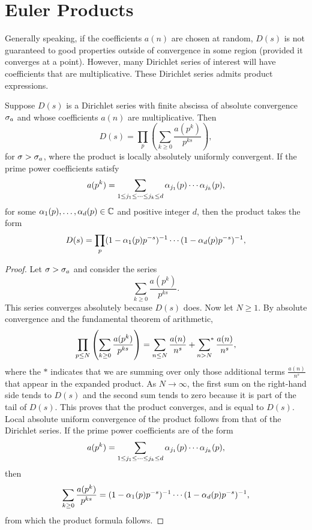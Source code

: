 \documentclass[12pt]{article}
\begin{document}
  \section{Euler Products}
    Generally speaking, if the coefficients \(a(n)\) are chosen at random, \(D(s)\) is not guaranteed to good properties outside of convergence in some region (provided it converges at a point). However, many Dirichlet series of interest will have coefficients that are multiplicative. These Dirichlet series admits product expressions.

    \begin{proposition}\label{prop:Dirichlet_series_Euler_product}
        Suppose \(D(s)\) is a Dirichlet series with finite abscissa of absolute convergence \(\sigma_{a}\) and whose coefficients \(a(n)\) are multiplicative. Then
        \[
          D(s) = \prod_{p}\left(\sum_{k \ge 0}\frac{a(p^{k})}{p^{ks}}\right),
        \]
        for \(\sigma > \sigma_{a}\), where the product is locally absolutely uniformly convergent. If the prime power coefficients satisfy
        \[
          a(p^{k}) = \sum_{1 \le j_{1} \le \cdots \le j_{k} \le d}\alpha_{j_{1}}(p) \cdots \alpha_{j_{k}}(p),
        \]
        for some \(\alpha_{1}(p),\ldots,\alpha_{d}(p) \in \mathbb{C}\) and positive integer \(d\), then the product takes the form
        \[
          D(s) = \prod_{p}(1-\alpha_{1}(p)p^{-s})^{-1} \cdots (1-\alpha_{d}(p)p^{-s})^{-1},
        \]
    \end{proposition}
    \begin{proof}
        Let \(\sigma > \sigma_{a}\) and consider the series
        \[
          \sum_{k \ge 0}\frac{a(p^{k})}{p^{ks}}.
        \]
        This series converges absolutely because \(D(s)\) does. Now let \(N \ge 1\). By absolute convergence and the fundamental theorem of arithmetic,
        \[
          \prod_{p \le N}\left(\sum_{k \ge 0}\frac{a(p^{k})}{p^{ks}}\right) = \sum_{n \le N}\frac{a(n)}{n^{s}}+\sideset{}{^{\ast}}\sum_{n > N}\frac{a(n)}{n^{s}},
        \]
        where the \(\ast\) indicates that we are summing over only those additional terms \(\frac{a(n)}{n^{s}}\) that appear in the expanded product. As \(N \to \infty\), the first sum on the right-hand side tends to \(D(s)\) and the second sum tends to zero because it is part of the tail of \(D(s)\). This proves that the product converges, and is equal to \(D(s)\). Local absolute uniform convergence of the product follows from that of the Dirichlet series. If the prime power coefficients are of the form
        \[
          a(p^{k}) = \sum_{1 \le j_{1} \le \cdots \le j_{k} \le d}\alpha_{j_{1}}(p) \cdots \alpha_{j_{k}}(p),
        \]
        then
        \[
          \sum_{k \ge 0}\frac{a(p^{k})}{p^{ks}} = (1-\alpha_{1}(p)p^{-s})^{-1} \cdots (1-\alpha_{d}(p)p^{-s})^{-1},
        \]
        from which the product formula follows.
    \end{proof}
\end{document}
